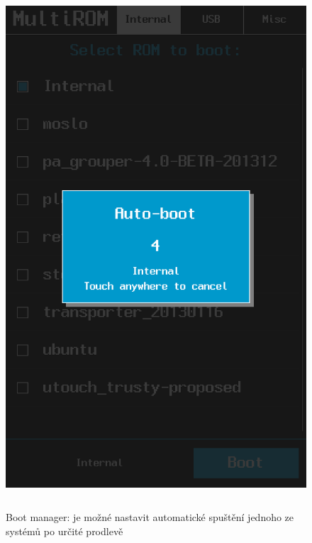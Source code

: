 \documentclass[12pt, a4paper, oneside]{article}
\begin{document}
\newpage
\voffset=0pt
\addtolength{\footskip}{-70pt}

\begin{figure}[H]
\begin{center}
 \includegraphics[height=550pt]{../img/boot_manager_autoboot.png}
\caption{Boot manager: je možné nastavit automatické spuštění jednoho ze systémů po určité prodlevě}
\end{center}
\end{figure}
\end{document}

